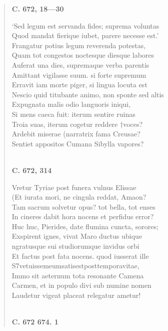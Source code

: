 \documentclass[11pt, a4paper]{report}
\begin{document}
\begin{verse}
    \begin{center} \textbf{C. 672, 18—30} \end{center} \marginpar{[147]} ‘Sed legum est servanda fides; suprema voluntas \\ Quod mandat fierique iubet, parere necesse est.’ \\ Frangatur potius legum reverenda potestas, \\ Quam tot congestos noctesque diesque labores \\ Auferat una dies, supremaque verba parentis \\ Amittant vigilasse suum. si forte supremum \\ Erravit iam morte piger, si lingua locuta est \\ Nescio quid titubante animo, non sponte sed altis \\ Expugnata malis odio languoris iniqui, \\ Si mens caeca fuit: iterum sentire ruinas \\ Troia suas, iterum cogetur reddere †voces? \\ Ardebit miserae (narratrix fama Creusae? \\ Sentiet appositos Cumana Sibylla vapores? \\ 
        ﻿\pagebreak 
    \begin{center} \textbf{C. 672, 314} \end{center} \marginpar{[148]} Vretur Tyriae post funera vulnus Elissae \\ (Et iurata mori, ne cingula reddat, Amaon? \\ Tam sacrum solvetur opus? tot bella, tot enses \\ In cineres dabit hora nocens et perfidus error? \\ Huc huc, Pierides, date flumina cuncta, sorores; \\ Exspirent ignes, vivat Maro ductus ubique \\ ngratusque sui studiorumque invidus orbi \\ Et factus post fata nocens. quod iusserat ille \\ S7vetuissemeumsatisestposttemporavitae, \\ Immo sit aeternum tota resonante Camena \\ Carmen, et in populo divi sub numine nomen \\ Laudetur vigeat placeat relegatur ametur! \\ 
        ﻿\pagebreak 
    \begin{center} \textbf{C. 672 674. 1} \end{center} \marginpar{[149]} 
      \end{verse}
  
\end{document}
